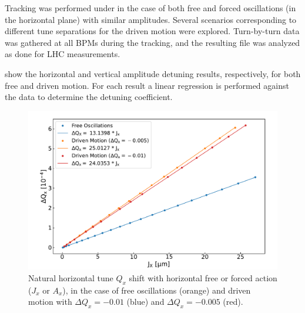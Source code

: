 Tracking was performed under in the case of both free and forced oscillations (in the horizontal plane) with similar amplitudes.
Several scenarios corresponding to different tune separations for the driven motion were explored.
Turn-by-turn data was gathered at all BPMs during the tracking, and the resulting file was analyzed as done for LHC measurements.

 show the horizontal and vertical amplitude detuning results, respectively, for both free and driven motion.
For each result a linear regression is performed against the data to determine the detuning coefficient.

\begin{figure}[!htb]
    \centering
    \includegraphics*[width=\textwidth]{Figures/Other_Studies/direct_detuning_driven_vs_free.pdf}
    \caption{Natural horizontal tune \(Q_x\) shift with horizontal free or forced action (\(J_x\) or \(A_x\)), in the case of free oscillations (\textcolor{mplorange}{orange}) and driven motion with \(\Delta Q_x = -0.01\) (\textcolor{mplblue}{blue}) and \(\Delta Q_x = -0.005\) (\textcolor{mplred}{red}).}
    \label{figure:horizontal_detuning_comparison}
\end{figure}


